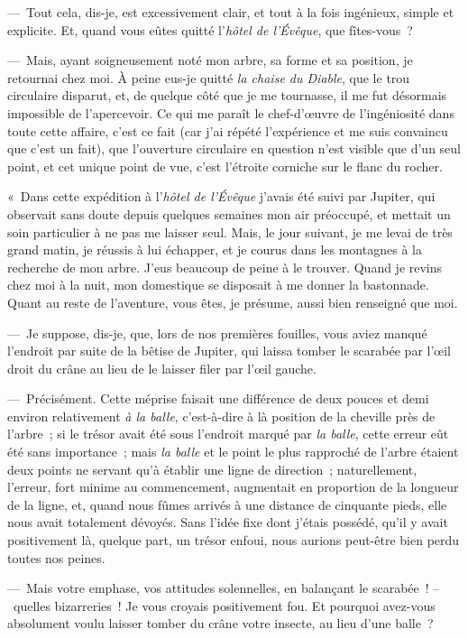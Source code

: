 \documentclass[french,twoside]{book} %
\begin{document}
— Tout cela, dis-je, est excessivement clair, et tout à la fois ingénieux, simple et explicite. Et, quand vous eûtes quitté l’\emph{hôtel de l’Évêque}, que fîtes-vous ?\par
— Mais, ayant soigneusement noté mon arbre, sa forme et sa position, je retournai chez moi. À peine eus-je quitté \emph{la chaise du Diable}, que le trou circulaire disparut, et, de quelque côté que je me tournasse, il me fut désormais impossible de l’apercevoir. Ce qui me paraît le chef-d’œuvre de l’ingéniosité dans toute cette affaire, c’est ce fait (car j’ai répété l’expérience et me suis convaincu que c’est un fait), que l’ouverture circulaire en question n’est visible que d’un seul point, et cet unique point de vue, c’est l’étroite corniche sur le flanc du rocher.\par
« Dans cette expédition à l’\emph{hôtel de l’Évêque} j’avais été suivi par Jupiter, qui observait sans doute depuis quelques semaines mon air préoccupé, et mettait un soin particulier à ne pas me laisser seul. Mais, le jour suivant, je me levai de très grand matin, je réussis à lui échapper, et je courus dans les montagnes à la recherche de mon arbre. J’eus beaucoup de peine à le trouver. Quand je revins chez moi à la nuit, mon domestique se disposait à me donner la bastonnade. Quant au reste de l’aventure, vous êtes, je présume, aussi bien renseigné que moi.\par
— Je suppose, dis-je, que, lors de nos premières fouilles, vous aviez manqué l’endroit par suite de la bêtise de Jupiter, qui laissa tomber le scarabée par l’œil droit du crâne au lieu de le laisser filer par l’œil gauche.\par
— Précisément. Cette méprise faisait une différence de deux pouces et demi environ relativement \emph{à la balle}, c’est-à-dire à là position de la cheville près de l’arbre ; si le trésor avait été sous l’endroit marqué par \emph{la balle}, cette erreur eût été sans importance ; mais \emph{la balle} et le point le plus rapproché de l’arbre étaient deux points ne servant qu’à établir une ligne de direction ; naturellement, l’erreur, fort minime au commencement, augmentait en proportion de la longueur de la ligne, et, quand nous fûmes arrivés à une distance de cinquante pieds, elle nous avait totalement dévoyés. Sans l’idée fixe dont j’étais possédé, qu’il y avait positivement là, quelque part, un trésor enfoui, nous aurions peut-être bien perdu toutes nos peines.\par
— Mais votre emphase, vos attitudes solennelles, en balançant le scarabée ! – quelles bizarreries ! Je vous croyais positivement fou. Et pourquoi avez-vous absolument voulu laisser tomber du crâne votre insecte, au lieu d’une balle ?\par
\end{document}
